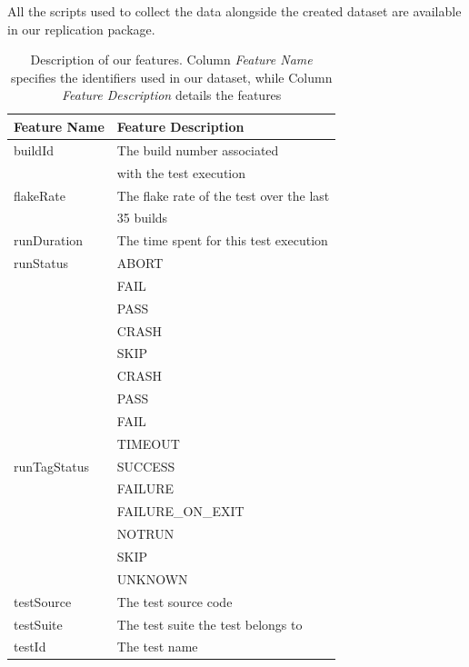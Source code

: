 All the scripts used to collect the data alongside the created dataset are available in our replication package.

\begin{table}[!ht]
\centering
\caption{Description of our features. Column \textit{Feature Name} specifies the identifiers used in our dataset, while Column \textit{Feature Description} details the features}
\label{table:infoRuns}
\begin{tabular}{ l | l } 
\toprule
\textbf{Feature Name} & \textbf{Feature Description} \\
\midrule
buildId & The build number associated \\
{} & with the test execution \\
\midrule
flakeRate & The flake rate of the test over the last\\  
{} & 35 builds \\
\midrule
runDuration & The time spent for this test execution \\
\midrule
runStatus & ABORT\\ {} & FAIL\\ {} & PASS\\ {} & CRASH\\ {} & SKIP \\
\midrule
\multirow[t]{9}{*}{runTagStatus} & CRASH\\ {} & PASS\\ {} & FAIL\\ {} & TIMEOUT\\ {} & SUCCESS \\
{} & FAILURE\\ {} & FAILURE\_ON\_EXIT\\ {} & NOTRUN\\ {} & SKIP\\ {} & UNKNOWN \\
\midrule
testSource & The test source code \\
\midrule
testSuite & The test suite the test belongs to \\
\midrule
testId & The test name \\
\bottomrule
\end{tabular}
\end{table}

